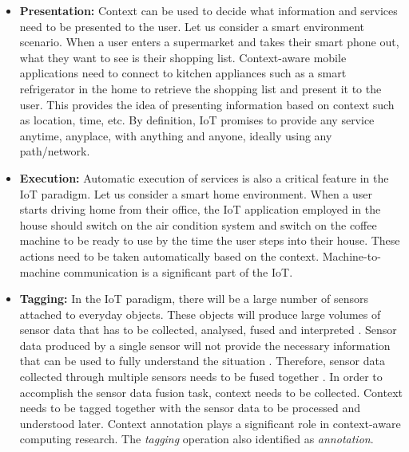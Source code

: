 \documentclass[journal]{IEEEtran}
\begin{document}
 \begin{itemize}
\item \textbf{Presentation:} Context  can be used to decide what information  and services need to be presented to the user. Let us consider a smart \cite{P007} environment  scenario. When a user enters a supermarket   and takes their smart phone out, what they want to see is their shopping list. Context-aware mobile  applications  need to connect to kitchen appliances  such as a smart refrigerator \cite{P352} in the home to retrieve  the shopping list and present it  to the user. This provides the idea of presenting information  based on context such as location,  time, etc. By definition, IoT promises to provide any service anytime, anyplace, with anything and anyone, ideally using any path/network.

 \item \textbf{Execution:} Automatic execution  of services  is also a critical feature in the IoT paradigm. Let us consider  a smart home  \cite{P007} environment. When a user  starts driving home from their office, the IoT application employed  in  the house should switch  on the air condition system and switch on the coffee machine  to be ready to use  by the time the user  steps into their house. These actions need to be taken automatically  based on the context. Machine-to-machine communication is a significant  part of the IoT.


 \item\textbf{Tagging:} In the IoT paradigm,  there will be a  large number of sensors attached to everyday objects. These objects will produce  large volumes  of sensor  data that has  to be collected, analysed,  fused and interpreted \cite{P109}. Sensor data produced by a  single sensor  will  not provide the necessary information that can be used to fully understand the situation \cite{IA06}.  Therefore,  sensor data collected  through multiple sensors  needs  to be fused together \cite{IA05}.  In order to accomplish the sensor data fusion task, context needs to be collected.  Context needs to be tagged together with the sensor data to be processed and understood later. Context annotation  plays a  significant role in context-aware computing research. The  \textit{tagging} operation also identified as \textit{annotation}. 

 \end{itemize}
 

 
 
 
 
\end{document}
